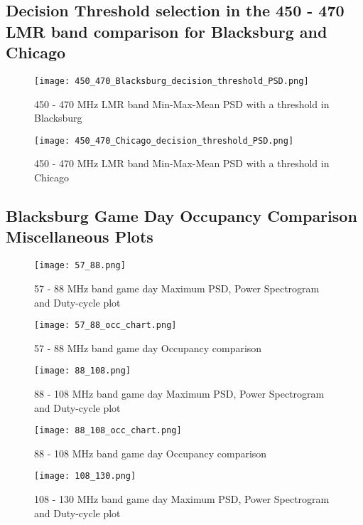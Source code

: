 \documentclass[12pt,sts]{report}
\begin{document}
\subsection*{Decision Threshold selection in the 450 - 470 LMR band comparison for Blacksburg and Chicago}

\begin{figure}[ht!]
	\centering
		\texttt{[image: 450\_470\_Blacksburg\_decision\_threshold\_PSD.png]}
	\caption{450 - 470 MHz LMR band Min-Max-Mean PSD with a threshold in Blacksburg}
\end{figure}

\begin{figure}[ht!]
	\centering
		\texttt{[image: 450\_470\_Chicago\_decision\_threshold\_PSD.png]}
	\caption{450 - 470 MHz LMR band Min-Max-Mean PSD with a threshold in Chicago}
\end{figure}

\subsection*{Blacksburg Game Day Occupancy Comparison Miscellaneous Plots}

\begin{figure}[ht!]
	\centering
		\texttt{[image: 57\_88.png]}
	\caption{57 - 88 MHz band game day Maximum PSD, Power Spectrogram and Duty-cycle plot}
\end{figure}

\begin{figure}[ht!]
	\centering
		\texttt{[image: 57\_88\_occ\_chart.png]}
	\caption{57 - 88 MHz band game day Occupancy comparison}
\end{figure}

\begin{figure}[ht!]
	\centering
		\texttt{[image: 88\_108.png]}
	\caption{88 - 108 MHz band game day Maximum PSD, Power Spectrogram and Duty-cycle plot}
\end{figure}

\begin{figure}[ht!]
	\centering
		\texttt{[image: 88\_108\_occ\_chart.png]}
	\caption{88 - 108 MHz band game day Occupancy comparison}
\end{figure}

\begin{figure}[ht!]
	\centering
		\texttt{[image: 108\_130.png]}
	\caption{108 - 130 MHz band game day Maximum PSD, Power Spectrogram and Duty-cycle plot}
\end{figure}
\end{document}
